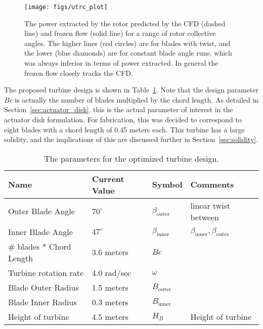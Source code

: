   \begin{figure}[!htb]
   \begin{center}
    \texttt{[image: figs/utrc\_plot]}
    \caption{The power extracted by the rotor predicted by the CFD
    (dashed line) and frozen flow (solid line) for a range of rotor
    collective angles. The higher lines (red circles) are for blades
    with twist, and the lower (blue diamonds) are for constant blade
    angle runs, which was always  inferior in terms of power
    extracted. In general the frozen flow closely tracks the CFD.}
    \label{fig:UTRC_turbine}
   \end{center}
  \end{figure}

The proposed turbine design is shown in Table~\ref{tab:turbine}. Note
that the design parameter $Bc $ is actually the number of blades
multiplied by the chord length. As detailed in
Section~\ref{sec:actuator_disk}, this is the actual parameter of
interest in the actuator disk formulation. For fabrication, this was 
decided to correspond to eight blades with a chord length of 0.45 meters
each. This turbine has a large solidity, and the implications of this
are discussed further in Section~\ref{sec:solidity}. 

\begin{table}[]
\centering
 \caption{The parameters for the optimized turbine design.}
\begin{tabular}{l|l|l|l}
Name                & Current Value    & Symbol           & Comments \\
 \hline
Outer Blade Angle & $70^{\circ}$ & $\beta_{\text{outer}}$  & linear twist between \\
Inner Blade Angle & $47^{\circ}$ & $\beta_\text{inner}$    & 
	     $\beta_\text{inner},\beta_\text{outer}$ \\ 
\# blades * Chord Length & 3.6 meters  & $Bc $ &  \\
Turbine rotation rate & 4.0 rad/sec  & $\omega$         &  \\
Blade Outer Radius  & 1.5 meters   & $B_\text{outer}$ &  \\
Blade Inner Radius  & 0.3 meters   & $B_\text{inner}$ &  \\
Height of turbine   & 4.5 meters   & $H_B$            & Height of turbine \\
\hline
\end{tabular}
 \label{tab:turbine}
\end{table}

